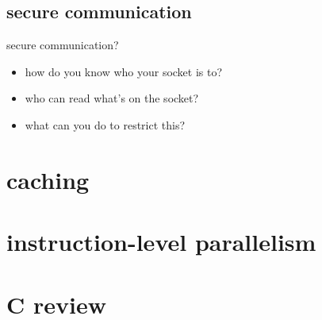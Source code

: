 

\subsection{secure communication}

\begin{frame}{secure communication?}
    \begin{itemize}
    \item how do you know who your socket is to?
    \item who can read what's on the socket?
    \item what can you do to restrict this?
    \end{itemize}
\end{frame}

\section{caching}




\section{instruction-level parallelism}



\section{C review}



